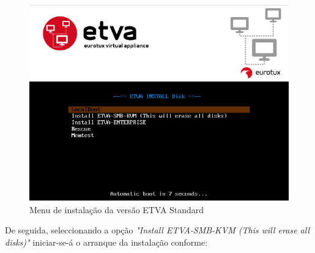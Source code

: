 \begin{figure}[H]
	\begin{center}
	\includegraphics[scale=0.6]{screenshots/install_etva1.png}
	\caption{Menu de instalação da versão ETVA Standard}
	\label{fig:boot_install_screen_standard}
	\end{center}
\end{figure}

De seguida, seleccionando a opção \emph{"Install ETVA-SMB-KVM (This will erase all disks)"} iniciar-se-á o arranque da instalação conforme:

